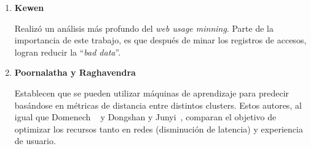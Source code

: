 \begin{enumerate}
{	}
  \item \textbf{Kewen~\cite{kewen2012} }
  
	{  
	Realizó un análisis más profundo del \emph{web usage minning}.
	Parte de la importancia de este trabajo, es que después de minar los registros de accesos, logran reducir la ``\emph{bad data}''.
	}

  \item \textbf{Poornalatha y Raghavendra~\cite{Poornalatha2012}}
  
	{ 
		
	  Establecen que se pueden utilizar máquinas de aprendizaje para predecir basándose en métricas de distancia entre distintos clusters. Estos autores, al igual que Domenech \etal~\cite{Domenech2006} y Dongshan y Junyi~\cite{Dongshan2002}, comparan el objetivo de optimizar los recursos tanto en redes (disminución de latencia) y experiencia de usuario.
	  }
  
  
\end{enumerate}








